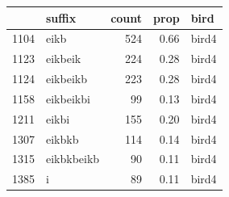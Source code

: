 \begin{table}[ht]
\centering
\begin{tabular}{rlrrl}
  \hline
 & suffix & count & prop & bird \\ 
  \hline
1104 & eikb & 524 & 0.66 & bird4 \\ 
  1123 & eikbeik & 224 & 0.28 & bird4 \\ 
  1124 & eikbeikb & 223 & 0.28 & bird4 \\ 
  1158 & eikbeikbi &  99 & 0.13 & bird4 \\ 
  1211 & eikbi & 155 & 0.20 & bird4 \\ 
  1307 & eikbkb & 114 & 0.14 & bird4 \\ 
  1315 & eikbkbeikb &  90 & 0.11 & bird4 \\ 
  1385 & i &  89 & 0.11 & bird4 \\ 
   \hline
\end{tabular}
\end{table}

